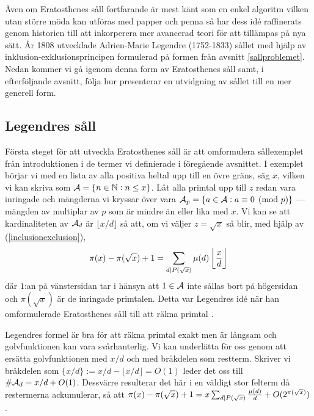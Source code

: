 
Även om Eratosthenes såll fortfarande är mest känt som en enkel algoritm vilken utan större möda kan utföras med papper och penna så har dess idé raffinerats genom historien till att inkorperera mer avancerad teori för att tillämpas på nya sätt. År 1808 utvecklade Adrien-Marie Legendre (1752-1833) sållet med hjälp av inklusion-exklusionsprincipen formulerad på formen från avsnitt \ref{sallproblemet}. Nedan kommer vi gå igenom denna form av Eratosthenes såll samt, i efterföljande avsnitt, följa hur \cite{cojocarumurty} presenterar en utvidgning av sållet till en mer generell form. 

\subsection{Legendres såll} \label{era.Legendres}

Första steget för att utveckla Eratosthenes såll är att omformulera sållexemplet från introduktionen i de termer vi definierade i föregående avsnittet. I exemplet börjar vi med en lista av alla positiva heltal upp till en övre gräns, säg $x$, vilken vi kan skriva som $\mathcal{A} = \{n \in \mathbb{N} : n \leq x\}$. Låt alla primtal upp till $z$ redan vara inringade och mängderna vi kryssar över vara \(\mathcal{A}_p = \{a \in \mathcal{A} :  a \equiv 0 \pmod{p}\}\) --- mängden av multiplar av $p$ som är mindre än eller lika med $x$. Vi kan se att kardinaliteten av \(\mathcal{A}_d\) är \(\lfloor x/d \rfloor\) så att, om vi väljer $z = \sqrt{x}$ så blir, med hjälp av (\ref{inclusionexclusion}),
\begin{align*}
    \pi(x) - \pi(\sqrt{x}) + 1 = \sum_{d \mid P(\sqrt{x})} \mu(d) \left\lfloor \frac{x}{d} \right\rfloor  
\end{align*}
där \(1\):an på vänstersidan tar i hänsyn att \(1 \in \mathcal{A}\) inte sållas bort på högersidan och \(\pi(\sqrt{x})\) är de inringade primtalen. Detta var Legendres idé när han omformulerade Eratosthenes såll till att räkna primtal \cite[kapitel 1.1]{opera}. 

Legendres formel är bra för att räkna primtal exakt men är långsam och golvfunktionen kan vara svårhanterlig. Vi kan underlätta för oss genom att ersätta golvfunktionen med $x/d$ och med bråkdelen som restterm. Skriver vi bråkdelen som \(\{x/d\} := x/d - \lfloor x/d \rfloor = O(1)\) leder det oss till \(\# \mathcal{A}_d = x/d + O(1)\). Dessvärre resulterar det här i en väldigt stor felterm då restermerna ackumulerar, så att \(\pi(x) - \pi(\sqrt{x}) + 1 = x \sum_{d \mid P(\sqrt{x})}\frac{\mu(d)}{d} + O(2^{\pi(\sqrt{x})}) \). %

